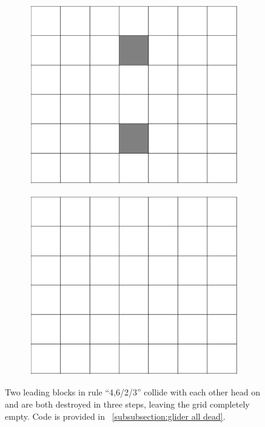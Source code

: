 \documentclass[12pt]{article}
\numberwithin{figure}{section} %
\begin{document}
\begin{figure}[H]
\begin{subfigure}{0.22\textwidth}
     		\subcaption{}
   	\end{subfigure}
     	\begin{subfigure}{0.22\textwidth}
     		\centering
     		\includegraphics[width=\linewidth]{Section4/31.2}
     		\subcaption{}
   	\end{subfigure}
        	\begin{subfigure}{0.22\textwidth}
     		\centering
     		\includegraphics[width=\linewidth]{Section4/31.3}
     		\subcaption{}
   	\end{subfigure}
   	\caption[Destroyed gliders in collision]{Two leading blocks in rule “4,6/2/3” collide with each other head on and are both destroyed in three steps, leaving the grid completely empty. Code is provided in ~\ref{subsubsection:glider all dead}. }
   	\label{fig:glider all dead}
	\vspace{-1.5em}
\end{figure}
\end{document}
